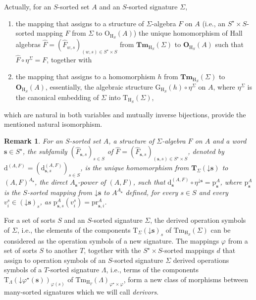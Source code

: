 \documentclass{amsart}
\newcommand{\vs}[1]{\mathbin{\downarrow}#1}
\theoremstyle{plain}
\newtheorem{remark}[theorem]{Remark}
\theoremstyle{definition}
\begin{document}
Actually, for an $S$-sorted set $A$ and an $S$-sorted signature $\Sigma$,
\begin{enumerate}
	\item the mapping that assigns to a structure of $\Sigma$-algebra $F$ on $A$ (i.e., an $S^{\star}\times S$-sorted mapping $F$ from $\Sigma$ to $\mathrm{O}_{\mathrm{H}_{S}}(A)$) the unique  homomorphism of Hall algebras $\widehat{F} = (\widehat{F}_{w,s})_{(w,s)\in S^{\star}\times S}$ from $\mathbf{Tm}_{\mathrm{H}_{S}}(\Sigma)$ to $\mathbf{O}_{\mathrm{H}_{S}}(A)$ such that $\widehat{F}\circ \eta^{\Sigma} = F$, together with
	\item the mapping that assigns to a homomorphism $h$ from $\mathbf{Tm}_{\mathrm{H}_{S}}(\Sigma)$ to $\mathbf{O}_{\mathrm{H}_{S}}(A)$, essentially, the algebraic structure $\mathrm{G}_{\mathrm{H}_{S}}(h)\circ \eta^{\Sigma}$ on $A$, where $\eta^{\Sigma}$ is the canonical embedding of $\Sigma$ into $\mathrm{T}_{\mathrm{H}_{S}}(\Sigma)$, 
\end{enumerate}
which are natural in both variables and mutually inverse bijections, provide the mentioned natural isomorphism.

\begin{remark}
	For an $S$-sorted set $A$, a structure of $\Sigma$-algebra $F$ on $A$ and a word $\mathbf{s}\in S^{\star}$, the subfamily $(\widehat{F}_{\mathbf{s},s})_{s\in S}$ of $\widehat{F} = (\widehat{F}_{\mathbf{s},s})_{(\mathbf{s},s)\in S^{\star}\times S}$,
	denoted by $\mathrm{d}^{(A,F)} = (\mathrm{d}^{(A,F)}_{\mathbf{s},s})_{s\in S}$, is the unique homomorphism from $\mathbf{T}_{\Sigma}(\vs{\mathbf{s}})$ to $(A,F)^{A_{\mathbf{s}}}$, the direct $A_{\mathbf{s}}$-power of $(A,F)$, such that $\mathrm{d}^{(A,F)}_{\mathbf{s}}\circ \eta^{\vs{\mathbf{s}}} = \mathrm{p}^{A}_{\mathbf{s}}$, where $\mathrm{p}^{A}_{\mathbf{s}}$ is the $S$-sorted mapping from $\vs{\mathbf{s}}$ to $A^{A_{\mathbf{s}}}$ defined, for every $s\in S$ and every $v^{s}_{i}\in(\vs{\mathbf{s}})_{s}$, as $\mathrm{p}^{A}_{\mathbf{s},s}(v^{s}_{i}) = \mathrm{pr}^{A}_{\mathbf{s},i}$.
\end{remark}

For a set of sorts $S$ and an $S$-sorted signature $\Sigma$, the derived operation symbols of $\Sigma$, i.e., the elements of the components $\mathrm{T}_{\Sigma}(\vs{\mathbf{s}})_{s}$ of $\mathrm{Tm}_{\mathrm{H}_{S}}(\Sigma)$ can be considered as the operation symbols of a new signature. The mappings $\varphi$ from a set of sorts $S$ to another $T$, together with the $S^{\star}\times S$-sorted mappings $d$ that assign to operation symbols of an $S$-sorted signature $\Sigma$ derived operations symbols of a $T$-sorted signature $\Lambda$, i.e., terms of the components $\mathrm{T}_{\Lambda}(\vs{\varphi^{\star}(\mathbf{s})})_{\varphi(s)}$ of $\mathrm{Tm}_{\mathrm{H}_{T}}(\Lambda)_{\varphi^{\star}\times\varphi}$, form a new class of morphisms between many-sorted signatures which we will call \emph{derivors}.
\end{document}
